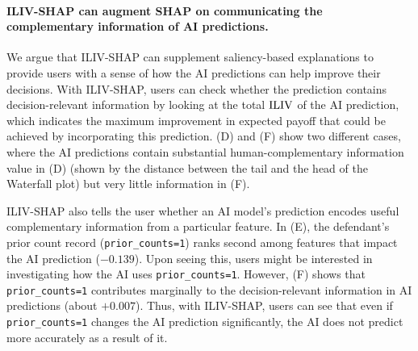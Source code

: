 
 \mvspace{-1mm}
\paragraph{ILIV-SHAP can augment SHAP on communicating the complementary information of AI predictions.}
We argue that ILIV-SHAP can supplement saliency-based explanations to provide users with a sense of how the AI predictions can help improve their decisions.
With ILIV-SHAP, users can check whether the prediction contains decision-relevant information by looking at the total $\operatorname{ILIV}$ of the AI prediction, which indicates the maximum improvement in expected payoff that could be achieved by incorporating this prediction. 
(D) and (F) show two different cases, where the AI predictions contain substantial human-complementary information value in (D) (shown by the distance between the tail and the head of the Waterfall plot) but very little information in (F).


ILIV-SHAP also tells the user whether an AI model's prediction encodes useful complementary information from a particular feature.
In (E), the defendant's prior count record (\texttt{prior\_counts=1}) ranks second among features that impact the AI prediction ($-0.139$).
Upon seeing this, users might be interested in investigating how the AI uses \texttt{prior\_counts=1}.
However, (F) shows that \texttt{prior\_counts=1} contributes marginally to the decision-relevant information in AI predictions (about $+0.007$).
Thus, with ILIV-SHAP, users can see that even if \texttt{prior\_counts=1} changes the AI prediction significantly, the AI does not predict more accurately as a result of it.
